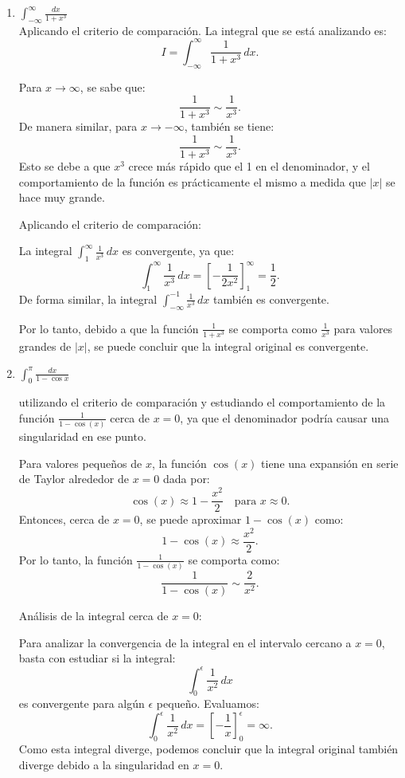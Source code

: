 \documentclass{article}
\begin{document}
\begin{enumerate}
\begin{enumerate}
		\item $ \int_{-\infty}^{\infty} \frac{dx}{1+x^3} $
        \[\]
Aplicando el criterio de comparación. La integral que se está analizando es:
\[
I = \int_{-\infty}^\infty \frac{1}{1 + x^3} \, dx.
\]

Para \(x \to \infty\), se sabe que:
\[
\frac{1}{1 + x^3} \sim \frac{1}{x^3}.
\]
De manera similar, para \(x \to -\infty\), también se tiene:
\[
\frac{1}{1 + x^3} \sim \frac{1}{x^3}.
\]
Esto se debe a que \(x^3\) crece más rápido que el 1 en el denominador, y el comportamiento de la función es prácticamente el mismo a medida que \(|x|\) se hace muy grande.

Aplicando el criterio de comparación:

La integral \(\int_{1}^\infty \frac{1}{x^3} \, dx\) es convergente, ya que:
\[
\int_{1}^\infty \frac{1}{x^3} \, dx = \left[ -\frac{1}{2x^2} \right]_{1}^\infty = \frac{1}{2}.
\]
De forma similar, la integral \(\int_{-\infty}^{-1} \frac{1}{x^3} \, dx\) también es convergente.  

Por lo tanto, debido a que la función \(\frac{1}{1 + x^3}\) se comporta como \(\frac{1}{x^3}\) para valores grandes de \(|x|\), se puede concluir que la integral original es convergente.

		\item $ \int_{0}^{\pi} \frac{dx}{1-\cos x} $
        \[\]

utilizando el criterio de comparación y estudiando el comportamiento de la función \(\frac{1}{1 - \cos(x)}\) cerca de \(x = 0\), ya que el denominador podría causar una singularidad en ese punto.

Para valores pequeños de \(x\), la función \(\cos(x)\) tiene una expansión en serie de Taylor alrededor de \(x = 0\) dada por:
\[
\cos(x) \approx 1 - \frac{x^2}{2} \quad \text{para } x \approx 0.
\]
Entonces, cerca de \(x = 0\), se puede aproximar \(1 - \cos(x)\) como:
\[
1 - \cos(x) \approx \frac{x^2}{2}.
\]
Por lo tanto, la función \(\frac{1}{1 - \cos(x)}\) se comporta como:
\[
\frac{1}{1 - \cos(x)} \sim \frac{2}{x^2}.
\]

Análisis de la integral cerca de \(x = 0\):

Para analizar la convergencia de la integral en el intervalo cercano a \(x = 0\), basta con estudiar si la integral:
\[
\int_0^\epsilon \frac{1}{x^2} \, dx
\]
es convergente para algún \(\epsilon\) pequeño. Evaluamos:
\[
\int_0^\epsilon \frac{1}{x^2} \, dx = \left[ -\frac{1}{x} \right]_0^\epsilon = \infty.
\]
Como esta integral diverge, podemos concluir que la integral original también diverge debido a la singularidad en \(x = 0\).


\end{enumerate}
\end{enumerate}
\end{document}
